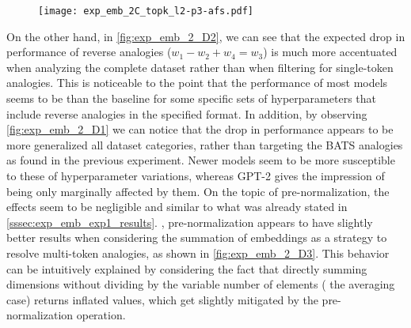 \begin{figure}[t!]
    \centering
    \texttt{[image: exp\_emb\_2C\_topk\_l2-p3-afs.pdf]}
    \caption{}
    \label{fig:exp_emb_2_C}
\end{figure}

On the other hand, in \cref{fig:exp_emb_2_D2}, we can see that the expected drop in performance of reverse analogies ($w_1 - w_2 + w_4 = w_3$) is much more accentuated when analyzing the complete dataset rather than when filtering for single-token analogies.
This is noticeable to the point that the performance of most models seems to be  than the baseline for some specific sets of hyperparameters that include reverse analogies in the specified format.
In addition, by observing \cref{fig:exp_emb_2_D1} we can notice that the drop in performance appears to be more generalized  all dataset categories, rather than targeting the BATS analogies as found in the previous experiment.
Newer models seem to be more susceptible to these  of hyperparameter variations, whereas GPT-2 gives the impression of being only marginally affected by them.
On the topic of pre-normalization, the effects seem to be negligible and similar to what was already stated in \cref{sssec:exp_emb_exp1_results}.
, pre-normalization appears to have slightly better results when considering the summation of embeddings as a strategy to resolve multi-token analogies, as shown in \cref{fig:exp_emb_2_D3}.
This behavior can be intuitively explained by considering the fact that directly summing dimensions without dividing by the variable number of elements ( the averaging case) returns inflated values, which get slightly mitigated by the pre-normalization operation.

\begin{figure}[t!]
    \centering
    \quad
    \caption{}
    \label{fig:exp_emb_2_D}
\end{figure}

